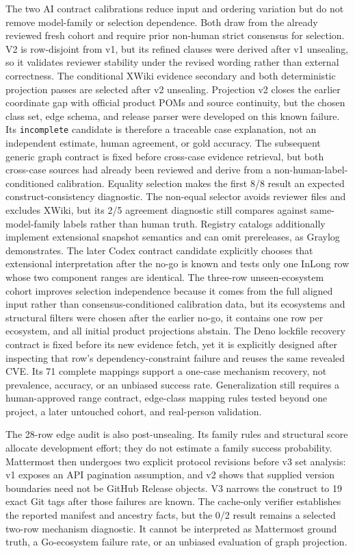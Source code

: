 The two AI contract calibrations reduce input and ordering variation but do not remove model-family or selection dependence. Both draw from the already reviewed fresh cohort and require prior non-human strict consensus for selection. V2 is row-disjoint from v1, but its refined clauses were derived after v1 unsealing, so it validates reviewer stability under the revised wording rather than external correctness. The conditional XWiki evidence secondary and both deterministic projection passes are selected after v2 unsealing. Projection v2 closes the earlier coordinate gap with official product POMs and source continuity, but the chosen class set, edge schema, and release parser were developed on this known failure. Its \texttt{incomplete} candidate is therefore a traceable case explanation, not an independent estimate, human agreement, or gold accuracy. The subsequent generic graph contract is fixed before cross-case evidence retrieval, but both cross-case sources had already been reviewed and derive from a non-human-label-conditioned calibration. Equality selection makes the first 8/8 result an expected construct-consistency diagnostic. The non-equal selector avoids reviewer files and excludes XWiki, but its 2/5 agreement diagnostic still compares against same-model-family labels rather than human truth. Registry catalogs additionally implement extensional snapshot semantics and can omit prereleases, as Graylog demonstrates. The later Codex contract candidate explicitly chooses that extensional interpretation after the no-go is known and tests only one InLong row whose two component ranges are identical. The three-row unseen-ecosystem cohort improves selection independence because it comes from the full aligned input rather than consensus-conditioned calibration data, but its ecosystems and structural filters were chosen after the earlier no-go, it contains one row per ecosystem, and all initial product projections abstain. The Deno lockfile recovery contract is fixed before its new evidence fetch, yet it is explicitly designed after inspecting that row's dependency-constraint failure and reuses the same revealed CVE. Its 71 complete mappings support a one-case mechanism recovery, not prevalence, accuracy, or an unbiased success rate. Generalization still requires a human-approved range contract, edge-class mapping rules tested beyond one project, a later untouched cohort, and real-person validation.

The 28-row edge audit is also post-unsealing. Its family rules and structural score allocate development effort; they do not estimate a family success probability. Mattermost then undergoes two explicit protocol revisions before v3 set analysis: v1 exposes an API pagination assumption, and v2 shows that supplied version boundaries need not be GitHub Release objects. V3 narrows the construct to 19 exact Git tags after those failures are known. The cache-only verifier establishes the reported manifest and ancestry facts, but the 0/2 result remains a selected two-row mechanism diagnostic. It cannot be interpreted as Mattermost ground truth, a Go-ecosystem failure rate, or an unbiased evaluation of graph projection.

